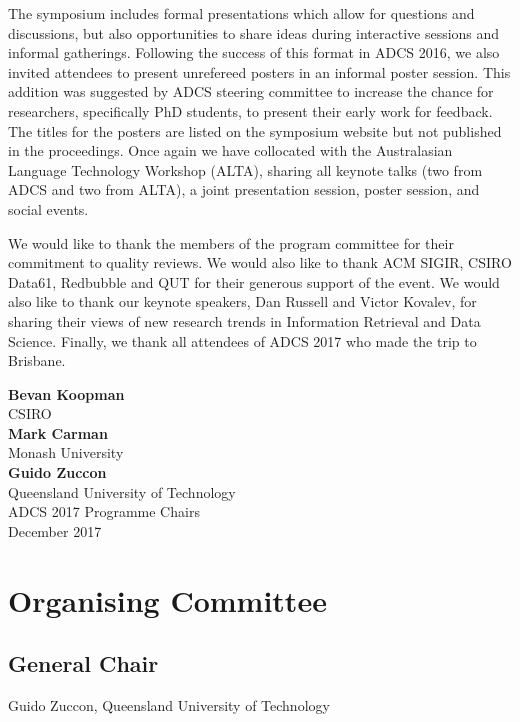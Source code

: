 \documentclass[a4paper]{article}
\begin{document}
The symposium includes formal presentations which allow for questions and
discussions, but also opportunities to share ideas during interactive sessions
and informal gatherings. Following the success of this format in ADCS 2016, we also invited attendees to present unrefereed posters in an informal poster session. This addition was suggested by ADCS steering committee to increase the chance for researchers, specifically PhD students, to present their early work for feedback. The titles for the posters are listed on the symposium website but not published in the proceedings. Once again we have collocated with the Australasian
Language Technology Workshop (ALTA), sharing all keynote talks (two from ADCS and two from ALTA), a joint presentation session, poster session, and social events.

We would like to thank the members of the program committee for their
commitment to quality reviews. We would also like to thank ACM SIGIR, CSIRO Data61, Redbubble and QUT 
 for their generous support of the event. We would
also like to thank our keynote speakers, Dan Russell and Victor Kovalev, for sharing their views of new
research trends in Information Retrieval and Data Science. Finally, we thank all attendees of
ADCS 2017 who made the trip to Brisbane.

\vspace{1cm}

\begin{flushright}\noindent
\textbf{Bevan Koopman}\\
CSIRO \\[.1in]
\textbf{Mark Carman}\\
Monash University\\[.1in]
\textbf{Guido Zuccon}\\
Queensland University of Technology \\[.1in]
ADCS 2017 Programme Chairs\\
December 2017
\end{flushright}

\newpage


\section*{Organising Committee}


\subsection*{General Chair}

Guido Zuccon, Queensland University of Technology
\end{document}
